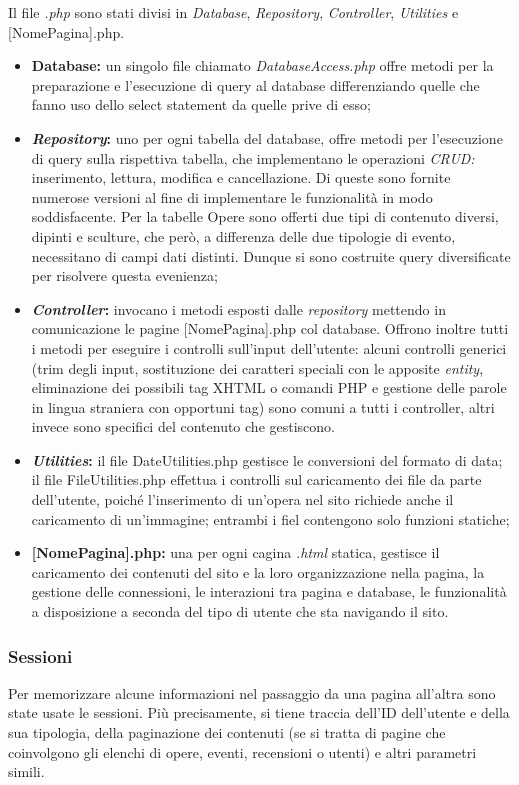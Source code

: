 Il file \textit{.php} sono stati divisi in \textit{Database}, \textit{Repository}, \textit{Controller}, \textit{Utilities} e [NomePagina].php. 
\begin{itemize}
	\item \textbf{Database:} un singolo file chiamato \textit{DatabaseAccess.php} offre metodi per la preparazione e l'esecuzione di query al database differenziando quelle che fanno uso dello select statement da quelle prive di esso;
	\item \textbf{\textit{Repository}:} uno per ogni tabella del database, offre metodi per l'esecuzione di query sulla rispettiva tabella, che implementano le operazioni \textit{CRUD:} inserimento, lettura, modifica e cancellazione. Di queste sono fornite numerose versioni al fine di implementare le funzionalità in modo soddisfacente. Per la tabelle Opere sono offerti due tipi di contenuto diversi, dipinti e sculture, che però, a differenza delle due tipologie di evento, necessitano di campi dati distinti. Dunque si sono costruite query diversificate per risolvere questa evenienza;
	\item \textbf{\textit{Controller}:} invocano i metodi esposti dalle \textit{repository} mettendo in comunicazione le pagine [NomePagina].php col database. Offrono inoltre tutti i metodi per eseguire i controlli sull'input dell'utente: alcuni controlli generici (trim degli input, sostituzione dei caratteri speciali con le apposite \textit{entity}, eliminazione dei possibili tag XHTML o comandi PHP e gestione delle parole in lingua straniera con opportuni tag) sono comuni a tutti i controller, altri invece sono specifici del contenuto che gestiscono.
	\item \textbf{\textit{Utilities}:} il file DateUtilities.php gestisce le conversioni del formato di data; il file FileUtilities.php effettua i controlli sul caricamento dei file da parte dell'utente, poiché l'inserimento di un'opera nel sito richiede anche il caricamento di un'immagine; entrambi i fiel contengono solo funzioni statiche;
	\item \textbf{[NomePagina].php:} una per ogni cagina \textit{.html} statica, gestisce il caricamento dei contenuti del sito e la loro organizzazione nella pagina, la gestione delle connessioni, le interazioni tra pagina e database, le funzionalità a disposizione a seconda del tipo di utente che sta navigando il sito. 
\end{itemize}

\subsubsection{Sessioni}
\label{implementazione-php-sessioni}
Per memorizzare alcune informazioni nel passaggio da una pagina all'altra sono state usate le sessioni. Più precisamente, si tiene traccia dell'ID dell'utente e della sua tipologia, della paginazione dei contenuti (se si tratta di pagine che coinvolgono gli elenchi di opere, eventi, recensioni o utenti) e altri parametri simili.

